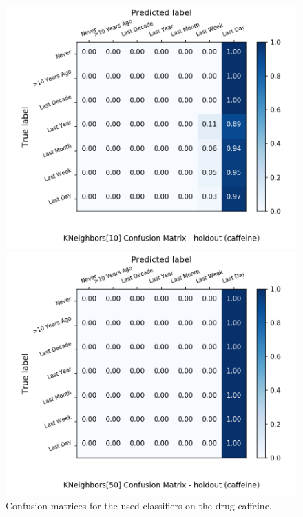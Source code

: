 \begin{figure}[H]
\begin{minipage}[b]{0.32\textwidth}
		\includegraphics[width=1.1\textwidth]{Plots/caffeine_KNeighbors_10_balance_False_holdout.png}
  \end{minipage}
	\begin{minipage}[b]{0.32\textwidth}
		\includegraphics[width=1.1\textwidth]{Plots/caffeine_KNeighbors_50_balance_False_holdout.png}
  \end{minipage}
	\caption{Confusion matrices for the used classifiers on the drug caffeine.}
\end{figure}

